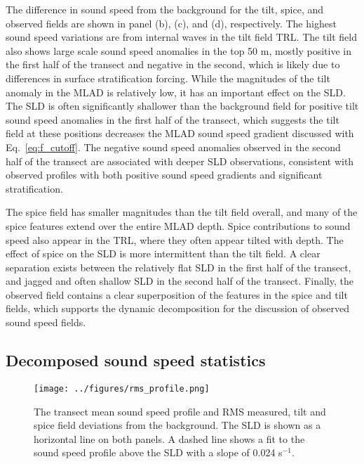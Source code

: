 \documentclass[preprint,NumberedRefs]{JASA}
\begin{document}
The difference in sound speed from the background for the tilt, spice, and observed fields are shown in panel (b), (c), and (d), respectively. The highest sound speed variations are from internal waves in the tilt field TRL. The tilt field also shows large scale sound speed anomalies in the top 50 m, mostly positive in the first half of the transect and negative in the second, which is likely due to differences in surface stratification forcing\cite{colosi2020observations}. While the magnitudes of the tilt anomaly in the MLAD is relatively low, it has an important effect on the SLD. The SLD is often significantly shallower than the background field for positive tilt sound speed anomalies in the first half of the transect, which suggests the tilt field at these positions decreases the MLAD sound speed gradient discussed with Eq.~\eqref{eq:f_cutoff}. The negative sound speed anomalies observed in the second half of the transect are associated with deeper SLD observations, consistent with observed profiles with both positive sound speed gradients and significant stratification\cite{colosi2020observations}.

The spice field has smaller magnitudes than the tilt field overall, and many of the spice features extend over the entire MLAD depth. Spice contributions to sound speed also appear in the TRL, where they often appear tilted with depth. The effect of spice on the SLD is more intermittent than the tilt field. A clear separation exists between the relatively flat SLD in the first half of the transect, and jagged and often shallow SLD in the second half of the transect. Finally, the observed field contains a clear superposition of the features in the spice and tilt fields, which supports the dynamic decomposition for the discussion of observed sound speed fields.

\subsection{Decomposed sound speed statistics}
\begin{figure}
\texttt{[image: ../figures/rms\_profile.png]}
        \caption{\label{fig:c_rms}{The transect mean sound speed profile and RMS measured, tilt and spice field deviations from the background. The SLD is shown as a horizontal line on both panels. A dashed line shows a fit to the sound speed profile above the SLD with a slope of 0.024 s$^{-1}$.}}
\end{figure}
\end{document}
